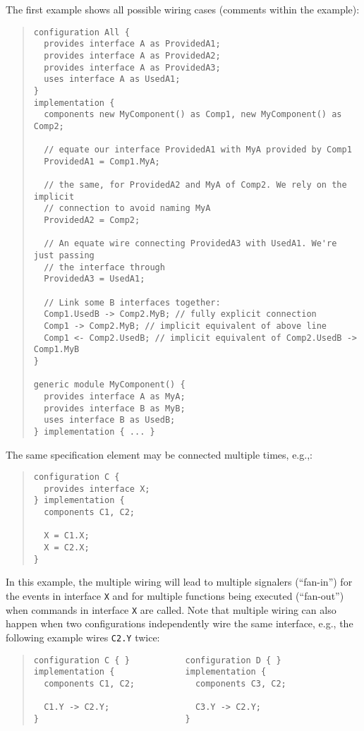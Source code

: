 \documentclass[11pt,letterpaper]{article}
\newcommand{\code}[1]{{\tt #1}}
\begin{document}
The first example shows all possible wiring cases (comments within the
example):
\begin{quote}
\begin{verbatim}
configuration All {
  provides interface A as ProvidedA1;
  provides interface A as ProvidedA2;
  provides interface A as ProvidedA3;
  uses interface A as UsedA1;
}
implementation {
  components new MyComponent() as Comp1, new MyComponent() as Comp2;

  // equate our interface ProvidedA1 with MyA provided by Comp1
  ProvidedA1 = Comp1.MyA; 

  // the same, for ProvidedA2 and MyA of Comp2. We rely on the implicit
  // connection to avoid naming MyA
  ProvidedA2 = Comp2;

  // An equate wire connecting ProvidedA3 with UsedA1. We're just passing
  // the interface through
  ProvidedA3 = UsedA1;

  // Link some B interfaces together:
  Comp1.UsedB -> Comp2.MyB; // fully explicit connection
  Comp1 -> Comp2.MyB; // implicit equivalent of above line
  Comp1 <- Comp2.UsedB; // implicit equivalent of Comp2.UsedB -> Comp1.MyB
}

generic module MyComponent() {
  provides interface A as MyA;
  provides interface B as MyB;
  uses interface B as UsedB;
} implementation { ... }
\end{verbatim}
\end{quote}

The same specification element may be connected multiple times, e.g.,:
\begin{quote} \begin{verbatim}
configuration C {
  provides interface X;
} implementation {
  components C1, C2;

  X = C1.X;
  X = C2.X;
}
\end{verbatim} \end{quote}
In this example, the multiple wiring will lead to multiple signalers
(``fan-in'') for the events in interface \code{X} and for multiple
functions being executed (``fan-out'') when commands in interface \code{X}
are called. Note that multiple wiring can also happen when two
configurations independently wire the same interface, e.g., the
following example wires \code{C2.Y} twice:
\begin{quote} \begin{verbatim}
configuration C { }           configuration D { }
implementation {              implementation {
  components C1, C2;            components C3, C2;

  C1.Y -> C2.Y;                 C3.Y -> C2.Y;
}                             }
\end{verbatim} \end{quote}
\end{document}
